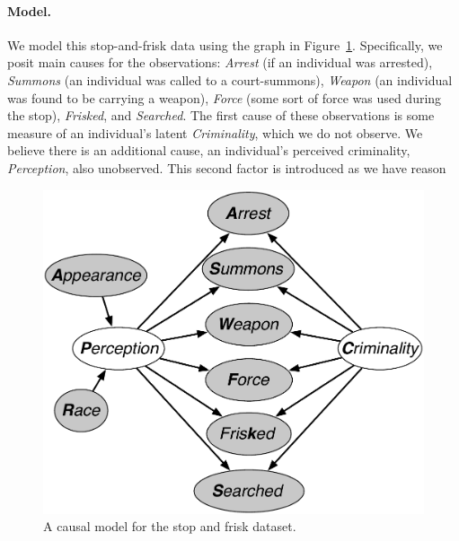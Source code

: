 \paragraph{Model.}
We model this stop-and-frisk data using the graph in Figure~\ref{figure.stop_and_frisk}. Specifically, we posit main causes for the observations: \emph{Arrest} (if an individual was arrested), \emph{Summons} (an individual was called to a court-summons), \emph{Weapon} (an individual was found to be carrying a weapon), \emph{Force} (some sort of force was used during the stop), \emph{Frisked}, and \emph{Searched}. The first cause of these observations is some measure of an individual's latent \emph{Criminality}, which we do not observe. We believe there is an additional cause, an individual's perceived criminality, \emph{Perception}, also unobserved. This second factor is introduced as we have reason


\begin{figure}[th]
\begin{center}
\vspace{-1ex}
\centerline{\includegraphics[width=\columnwidth]{stop_and_frisk_model3.pdf}}
\vspace{-2ex}
\caption{A causal model for the stop and frisk dataset.\label{figure.stop_and_frisk}\vspace{-4ex}}
\vspace{-2ex}
\end{center}
\end{figure}


